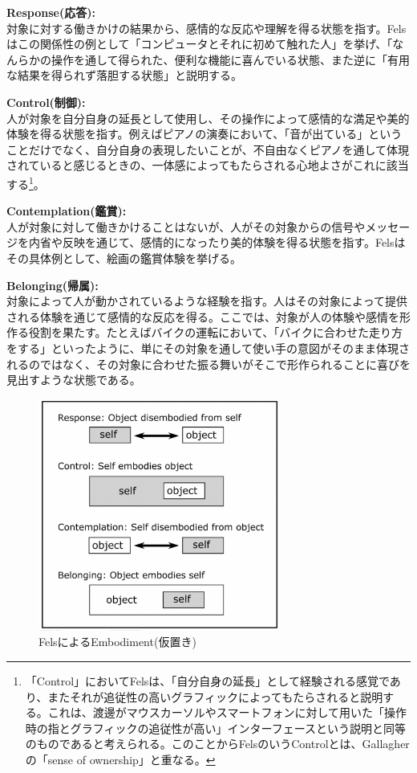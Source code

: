 \textbf{Response(応答):}\\
対象に対する働きかけの結果から、感情的な反応や理解を得る状態を指す。Felsはこの関係性の例として「コンピュータとそれに初めて触れた人」を挙げ、「なんらかの操作を通して得られた、便利な機能に喜んでいる状態、また逆に「有用な結果を得られず落胆する状態」と説明する。

\textbf{Control(制御):}\\
人が対象を自分自身の延長として使用し、その操作によって感情的な満足や美的体験を得る状態を指す。例えばピアノの演奏において、「音が出ている」ということだけでなく、自分自身の表現したいことが、不自由なくピアノを通して体現されていると感じるときの、一体感によってもたらされる心地よさがこれに該当する\footnote{「Control」においてFelsは、「自分自身の延長」として経験される感覚であり、またそれが追従性の高いグラフィックによってもたらされると説明する。これは、渡邊がマウスカーソルやスマートフォンに対して用いた「操作時の指とグラフィックの追従性が高い」インターフェースという説明と同等のものであると考えられる。このことからFelsのいうControlとは、Gallagherの「sense of ownership」と重なる。}。

\textbf{Contemplation(鑑賞):}\\
人が対象に対して働きかけることはないが、人がその対象からの信号やメッセージを内省や反映を通じて、感情的になったり美的体験を得る状態を指す。Felsはその具体例として、絵画の鑑賞体験を挙げる。

\textbf{Belonging(帰属):}\\
対象によって人が動かされているような経験を指す。人はその対象によって提供される体験を通じて感情的な反応を得る。ここでは、対象が人の体験や感情を形作る役割を果たす。たとえばバイクの運転において、「バイクに合わせた走り方をする」といったように、単にその対象を通して使い手の意図がそのまま体現されるのではなく、その対象に合わせた振る舞いがそこで形作られることに喜びを見出すような状態である。

\begin{figure}[H]
  \centering
  \includegraphics[width=8cm]{img/fels_diagram.png}
  \caption{FelsによるEmbodiment(仮置き)}
  \label{fig:fels_embodiment}
\end{figure}

